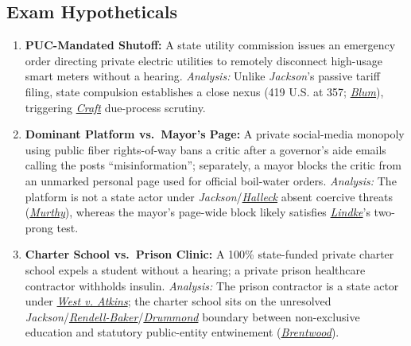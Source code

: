 \documentclass[12pt]{article}
\begin{document}
\subsection{Exam Hypotheticals}
\begin{enumerate}
  \item \textbf{PUC-Mandated Shutoff:} A state utility commission issues an emergency order directing private electric utilities to remotely disconnect high-usage smart meters without a hearing. \emph{Analysis:} Unlike \emph{Jackson}'s passive tariff filing, state compulsion establishes a close nexus (419 U.S. at 357; \href{https://supreme.justia.com/cases/federal/us/457/991/}{\emph{Blum}}), triggering \href{https://supreme.justia.com/cases/federal/us/436/1/}{\emph{Craft}} due-process scrutiny.
  \item \textbf{Dominant Platform vs.\ Mayor's Page:} A private social-media monopoly using public fiber rights-of-way bans a critic after a governor's aide emails calling the posts ``misinformation''; separately, a mayor blocks the critic from an unmarked personal page used for official boil-water orders. \emph{Analysis:} The platform is not a state actor under \emph{Jackson}/\href{https://www.law.cornell.edu/supremecourt/text/17-1702}{\emph{Halleck}} absent coercive threats (\href{https://supreme.justia.com/cases/federal/us/603/23-411/}{\emph{Murthy}}), whereas the mayor's page-wide block likely satisfies \href{https://www.law.cornell.edu/supremecourt/text/22-611}{\emph{Lindke}}'s two-prong test.
  \item \textbf{Charter School vs.\ Prison Clinic:} A 100\% state-funded private charter school expels a student without a hearing; a private prison healthcare contractor withholds insulin. \emph{Analysis:} The prison contractor is a state actor under \href{https://supreme.justia.com/cases/federal/us/487/42/}{\emph{West v. Atkins}}; the charter school sits on the unresolved \emph{Jackson}/\href{https://supreme.justia.com/cases/federal/us/457/830/}{\emph{Rendell-Baker}}/\href{https://www.law.cornell.edu/supct/cert/24-394}{\emph{Drummond}} boundary between non-exclusive education and statutory public-entity entwinement (\href{https://www.law.cornell.edu/supremecourt/text/531/288}{\emph{Brentwood}}).
\end{enumerate}
\end{document}
